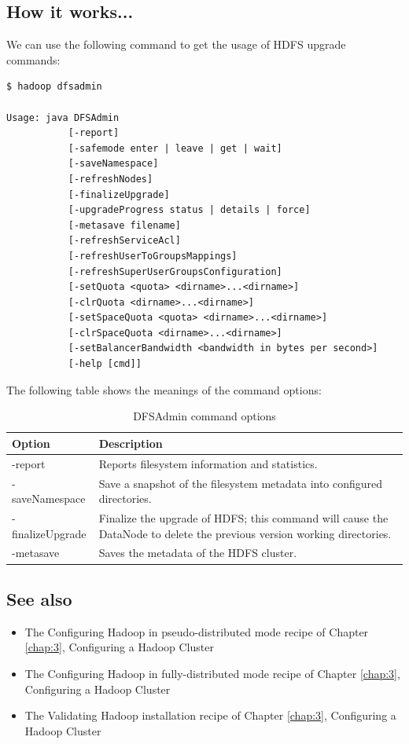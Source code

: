 \subsection*{How it works...}
We can use the following command to get the usage of HDFS upgrade commands:
\lstset{style=bashstyle}
\begin{lstlisting}
$ hadoop dfsadmin

Usage: java DFSAdmin
           [-report]
           [-safemode enter | leave | get | wait]
           [-saveNamespace]
           [-refreshNodes]
           [-finalizeUpgrade]
           [-upgradeProgress status | details | force]
           [-metasave filename]
           [-refreshServiceAcl]
           [-refreshUserToGroupsMappings]
           [-refreshSuperUserGroupsConfiguration]
           [-setQuota <quota> <dirname>...<dirname>]
           [-clrQuota <dirname>...<dirname>]
           [-setSpaceQuota <quota> <dirname>...<dirname>]
           [-clrSpaceQuota <dirname>...<dirname>]
           [-setBalancerBandwidth <bandwidth in bytes per second>]
           [-help [cmd]]
\end{lstlisting}

The following table shows the meanings of the command options:
\begin{table}
  \centering
  \small
  \begin{tabular}{lp{}}
    \toprule 
    \textbf{Option} & \textbf{Description} \\ \midrule 
    -report & Reports filesystem information and statistics. \\ 
    -saveNamespace & Save a snapshot of the filesystem metadata into configured directories. \\
    -finalizeUpgrade & Finalize the upgrade of HDFS; this command will cause the DataNode to delete the previous version working directories. \\
    -metasave & Saves the metadata of the HDFS cluster. \\ \bottomrule 
  \end{tabular}
  \caption{DFSAdmin command options}\label{tbl:dfsadmin}
\end{table}

\subsection*{See also}
\begin{itemize}
  \item The Configuring Hadoop in pseudo-distributed mode recipe of Chapter \ref{chap:3}, Configuring a Hadoop Cluster
  \item The Configuring Hadoop in fully-distributed mode recipe of Chapter \ref{chap:3}, Configuring a Hadoop Cluster
  \item The Validating Hadoop installation recipe of Chapter \ref{chap:3}, Configuring a Hadoop Cluster
\end{itemize}
